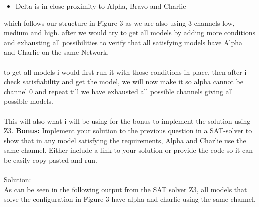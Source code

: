 \documentclass{article}
\newcommand*\moveToRight[1]{\hspace*{0em plus 1fill}\makebox{(#1)}}
\begin{document}
\begin{enumerate}[(a)]
\begin{itemize}
            \item Delta is in close proximity to Alpha, Bravo and Charlie
        \end{itemize}
        which follows our structure in Figure 3 as we are also using 3 channels low, medium and high. 
        after we would try to get all models by adding more conditions and exhausting all possibilities to verify that all satisfying models have Alpha and Charlie on the same Network.\\\\ to get all models i would first run it with those conditions in place, then after i check satisfiability and get the model, we will now make it so alpha cannot be channel 0 and repeat till we have exhausted all possible channels giving all possible models. \\\\ This will also what i will be using for the bonus to implement the solution using Z3.
        \newpage
        \textbf{Bonus:} Implement your solution to the previous question in a SAT-solver to show that in any model satisfying the requirements, Alpha and Charlie use the same channel. Either include a link to your solution or provide the code so it can be easily copy-pasted and run. \moveToRight{10* marks}\\\\
        Solution:\\
        
        As can be seen in the following output from the SAT solver Z3, all models that solve the configuration in Figure 3 have alpha and charlie using the same channel.

        
\end{enumerate}
\end{document}
